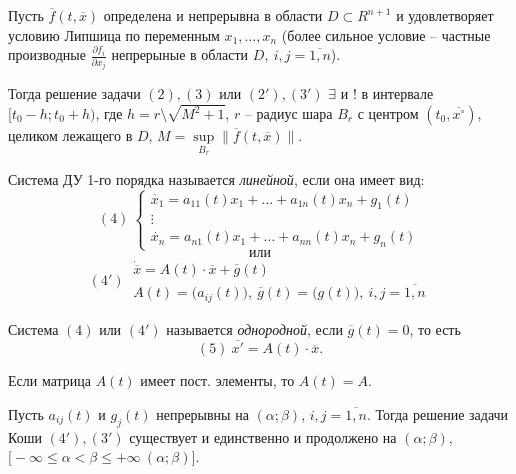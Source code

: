 \begin{theorem}
	Пусть $\overline{f} (t,\overline{x} )$ определена и непрерывна в области $D \subset R^{n+1} $ и удовлетворяет условию Липшица по переменным $x_1,\ldots ,x_n$ (более сильное условие -- частные производные $\frac{\partial f_i}{\partial x_j} $ непрерыные в области $D, \ i,j=\overline{1,n} $).

	Тогда решение задачи $(2),(3)$ или $(2 '),(3 ')$ $\exists $ и $!$ в интервале $[t_0 - h ; t_0 +h)$, где $h = r \setminus \sqrt{M^2 + 1} $, $r$ -- радиус шара $B_r$ с центром $(t_0,\overline{x^{\circ}  } )$, целиком лежащего в $D$, $M = \underset{B_r}{\sup} \big\|\overline{f} (t,\overline{x} )\big\|$.
\end{theorem}

\begin{definition}
	Система ДУ 1-го порядка называется \emph{линейной}, если она имеет вид:
	\[
		(4) \ \left\{\begin{array}{l}
			\dot{x_1} = a_{11} (t)x_1 + \ldots + a_{1n} (t)x_n + g_1(t) \\
			\vdots                                                      \\
			\dot{x_n} = a_{n1} (t)x_1 + \ldots + a_{nn} (t)x_n + g_n(t)
		\end{array}\right.
	\]
	\[
		\text{или}
	\]
	\[
		(4 ') \ \begin{array}{l}
			\dot{\overline{x} } = A(t) \cdot \overline{x} + \overline{g} (t) \\
			A(t) = \big(a_{ij} (t)\big), \ \overline{g} (t) = \big(g(t)\big), \ i,j = \overline{1,n}
		\end{array}

	\]
\end{definition}

\begin{definition}
	Система $(4)$ или $(4 ')$ называется \emph{однородной}, если $\overline{g} (t) = 0$, то есть
	\[
		(5) \ \overline{x '} = A(t) \cdot \overline{x}.
	\]

	Если матрица $A(t)$ имеет пост. элементы, то $A(t) =A$.
\end{definition}

\begin{theorem}
	Пусть $a_{ij} (t)$ и $g_j(t)$ непрерывны на $(\alpha ; \beta )$, $i,j=\overline{1,n} $. Тогда решение задачи Коши $(4 '), (3 ')$ существует и единственно и продолжено на $(\alpha ; \beta )$, $\big[-\infty \leqslant \alpha < \beta \leqslant +\infty \ (\alpha ; \beta )\big]$.
\end{theorem}


